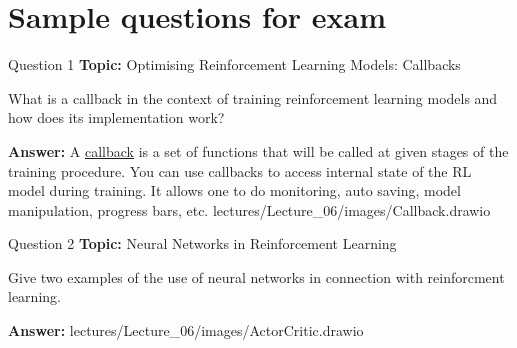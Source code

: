 \section{Sample questions for exam}

\begin{frame}{Question 1}
    \textbf{Topic:} Optimising Reinforcement Learning Models: Callbacks

    \vspace{10pt}

    What is a callback in the context of training reinforcement learning models and how does its implementation work?

    \vspace{20pt}

    \textbf{Answer:} A \href{https://stable-baselines3.readthedocs.io/en/master/guide/callbacks.html}{callback} is a set of functions that will be called at given stages of the training procedure. You can use callbacks to access internal state of the RL model during training. It allows one to do monitoring, auto saving, model manipulation, progress bars, etc.
    lectures/Lecture\_06/images/Callback.drawio

\end{frame}

\begin{frame}{Question 2}
    \textbf{Topic:} Neural Networks in Reinforcement Learning
    \vspace{10pt}

    Give two examples of the use of neural networks in connection with reinforcment learning.

    \vspace{20pt}

    \textbf{Answer:} lectures/Lecture\_06/images/ActorCritic.drawio
\end{frame}

